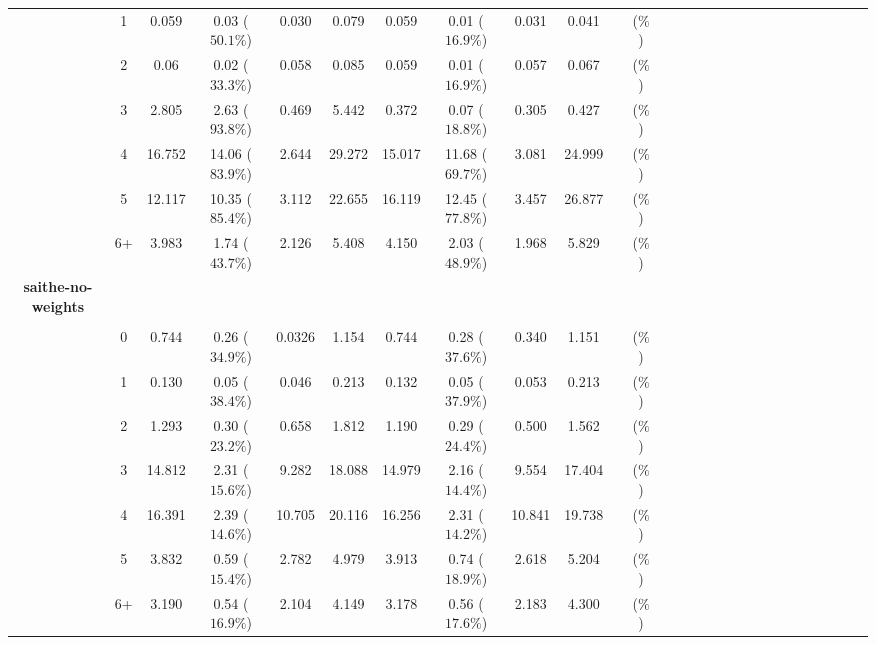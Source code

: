 \documentclass[a4paper 12pt]{article}
\numberwithin{equation}{section}
\begin{document}
\begin{tiny}
\begin{table}[h!]
\begin{tabular}{ccccccccccccccccccccccccccc}
\raisebox{1.5ex}{2018 Q1} & 1& 0.059 &0.03 ($50.1 \%$) & 0.030 & 0.079  & 0.059 &0.01 ($16.9 \%$) &0.031 &0.041 &  &  ($ \%$) \\[1ex]
& 2  & 0.06   & 0.02 ($33.3 \%$) &0.058 &0.085  &0.059  &0.01   ($16.9 \%$) &0.057 &0.067 & &  ($ \%$) \\[1ex]
& 3  & 2.805  & 2.63 ($93.8 \%$) &0.469 & 5.442 &0.372  &0.07   ($18.8 \%$) &0.305 &0.427 & &  ($ \%$) \\[1ex]
& 4  & 16.752 &14.06 ($83.9 \%$) &2.644 &29.272 &15.017 &11.68  ($69.7 \%$) &3.081 &24.999 & &  ($ \%$) \\[1ex]
& 5  & 12.117 &10.35 ($85.4 \%$) &3.112 &22.655 &16.119 &12.45 ($77.8 \%$) &3.457 &26.877 & &  ($ \%$) \\[1ex]
& 6+ & 3.983  &1.74  ($43.7 \%$) &2.126 & 5.408 &4.150  &2.03  ($48.9 \%$)  &1.968 &5.829 & &  ($ \%$)\\[3.5ex]



{\bf saithe-no-weights} \\[1.0ex]
\cmidrule(lr{0.1em}){1-1}\\[1.0ex]

\raisebox{1.5ex}{2017 Q3} & 0& 0.744 &0.26 ($34.9 \%$) & 0.0326 & 1.154  & 0.744 &0.28 ($37.6 \%$) &0.340 &1.151 &  &  ($ \%$) \\[1ex]
 & 1  & 0.130   & 0.05 ($38.4 \%$) &0.046 &0.213  &0.132  &0.05   ($37.9 \%$) &0.053 &0.213 & &  ($ \%$) \\[1ex]
& 2  & 1.293  & 0.30 ($23.2 \%$) &0.658 & 1.812 &1.190  &0.29   ($24.4 \%$) &0.500 &1.562 & &  ($ \%$) \\[1ex]
& 3  & 14.812 & 2.31 ($15.6 \%$) &9.282 &18.088 &14.979 &2.16  ($14.4 \%$) &9.554 &17.404 & &  ($ \%$) \\[1ex]
& 4  & 16.391 &2.39 ($14.6 \%$) &10.705 &20.116 &16.256 &2.31 ($14.2 \%$) &10.841 &19.738 & &  ($ \%$) \\[1ex]
& 5 & 3.832  &0.59  ($15.4 \%$) &2.782 & 4.979 &3.913  &0.74  ($18.9 \%$)  &2.618 &5.204 & &  ($ \%$)\\[1ex]
& 6+ & 3.190  &0.54  ($16.9 \%$) &2.104 & 4.149 &3.178  &0.56  ($17.6 \%$)  &2.183 &4.300 & &  ($ \%$)\\[3.5ex]


\end{tabular}
\end{table}
\end{tiny}
\end{document}
